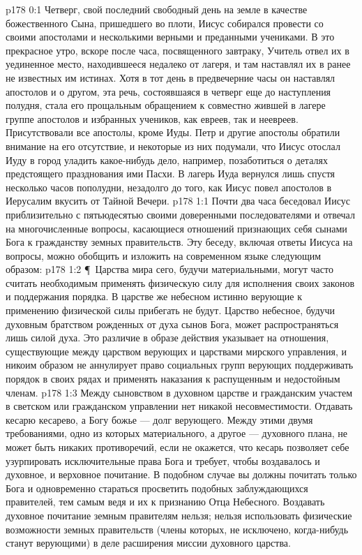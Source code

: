 \vs p178 0:1 Четверг, свой последний свободный день на земле в качестве божественного Сына, пришедшего во плоти, Иисус собирался провести со своими апостолами и несколькими верными и преданными учениками. В это прекрасное утро, вскоре после часа, посвященного завтраку, Учитель отвел их в уединенное место, находившееся недалеко от лагеря, и там наставлял их в ранее не известных им истинах. Хотя в тот день в предвечерние часы он наставлял апостолов и о другом, эта речь, состоявшаяся в четверг еще до наступления полудня, стала его прощальным обращением к совместно жившей в лагере группе апостолов и избранных учеников, как евреев, так и неевреев. Присутствовали все апостолы, кроме Иуды. Петр и другие апостолы обратили внимание на его отсутствие, и некоторые из них подумали, что Иисус отослал Иуду в город уладить какое\hyp{}нибудь дело, например, позаботиться о деталях предстоящего празднования ими Пасхи. В лагерь Иуда вернулся лишь спустя несколько часов пополудни, незадолго до того, как Иисус повел апостолов в Иерусалим вкусить от Тайной Вечери.
\vs p178 1:1 Почти два часа беседовал Иисус приблизительно с пятьюдесятью своими доверенными последователями и отвечал на многочисленные вопросы, касающиеся отношений признающих себя сынами Бога к гражданству земных правительств. Эту беседу, включая ответы Иисуса на вопросы, можно обобщить и изложить на современном языке следующим образом:
\vs p178 1:2 \P\ Царства мира сего, будучи материальными, могут часто считать необходимым применять физическую силу для исполнения своих законов и поддержания порядка. В царстве же небесном истинно верующие к применению физической силы прибегать не будут. Царство небесное, будучи духовным братством рожденных от духа сынов Бога, может распространяться лишь силой духа. Это различие в образе действия указывает на отношения, существующие между царством верующих и царствами мирского управления, и никоим образом не аннулирует право социальных групп верующих поддерживать порядок в своих рядах и применять наказания к распущенным и недостойным членам.
\vs p178 1:3 Между сыновством в духовном царстве и гражданским участем в светском или гражданском управлении нет никакой несовместимости. Отдавать кесарю кесарево, а Богу божье --- долг верующего. Между этими двумя требованиями, одно из которых материального, а другое --- духовного плана, не может быть никаких противоречий, если не окажется, что кесарь позволяет себе узурпировать исключительные права Бога и требует, чтобы воздавалось и духовное, и верховное почитание. В подобном случае вы должны почитать только Бога и одновременно стараться просветить подобных заблуждающихся правителей, тем самым ведя и их к признанию Отца Небесного. Воздавать духовное почитание земным правителям нельзя; нельзя использовать физические возможности земных правительств (члены которых, не исключено, когда\hyp{}нибудь станут верующими) в деле расширения миссии духовного царства.

